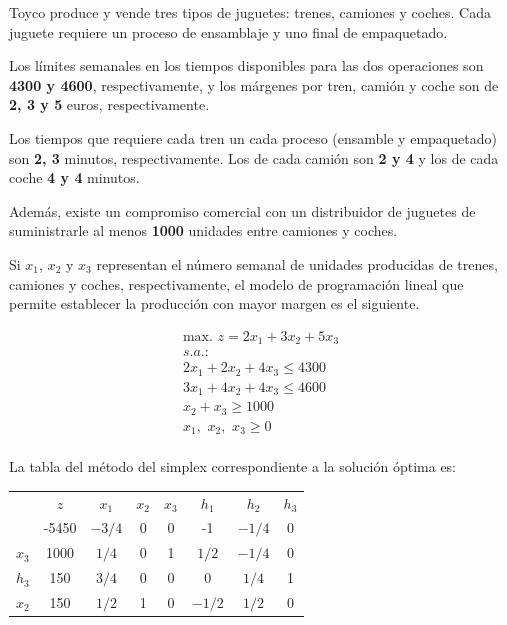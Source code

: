 Toyco produce y vende tres tipos de juguetes: trenes, camiones y coches. 
Cada juguete requiere un proceso de ensamblaje y uno final de empaquetado. 

Los límites semanales  en los tiempos disponibles para las dos operaciones son \textbf{4300 y 4600}, respectivamente, y los márgenes por tren, camión y coche son de \textbf{2, 3 y 5 }euros, respectivamente. 

Los tiempos que requiere cada tren un cada proceso (ensamble y empaquetado) son \textbf{2, 3} minutos, respectivamente. Los de cada camión son \textbf{2 y 4} y los de cada coche \textbf{4 y 4} minutos.

Además, existe un compromiso comercial con un distribuidor de juguetes de suministrarle al menos \textbf{1000} unidades entre camiones y coches.

Si $x_1$, $x_2$ y $x_3$ representan el número semanal de unidades producidas de trenes, camiones y coches, respectivamente, el modelo de programación lineal que permite establecer la producción con mayor margen es el siguiente.


\begin{equation}
\begin{split}
\mbox{max. } z = 2x_1 + 3x_2 + 5x_3\\
s.a.:\\
2x_1 + 2x_2 + 4x_3 \leq 4300\\
3x_1 + 4x_2 + 4x_3 \leq 4600\\
        x_2 +  x_3 \geq 1000\\
x_1,\,\,x_2,\,\,x_3\geq 0\\
\end{split}
\end{equation}

La tabla del método del simplex correspondiente a la solución óptima es:

\begin{center}
\begin{tabular}{c|c|cccccc|}
 & $z$ & $x_1$ & $x_2$ & $x_3$ & $h_1$ & $h_2$ & $h_3$\\ 
      & -5450 & $-3/4$ & 0 & 0 & -1 & $-1/4$ & 0 \\ 
\hline
$x_3$ & 1000  & $1/4$ & 0 & 1 & $1/2$ & $-1/4$ & 0\\ 
$h_3$ & 150  & $3/4$ & 0 & 0 & 0 & $1/4$ & 1\\ 
$x_2$ & 150  & $1/2$ & 1 & 0 & $-1/2$ & $1/2$ & 0\\ 
\hline
\end{tabular}
\end{center}





